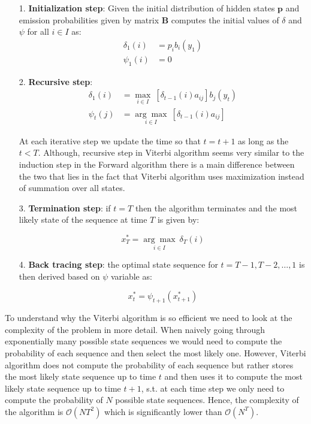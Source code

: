 \begin{itemize}
\item[1.] \textbf{Initialization step}: Given the initial distribution of hidden states $\textbf{p}$ and emission probabilities given by matrix $\textbf{B}$ computes the initial values 
of $\delta$ and $\psi$ for all $i \in I$ as:
\begin{align}
\delta_1(i) &= p_i b_i(y_1)  \\
\psi_1(i)& = 0
\end{align}

\item[2.] \textbf{Recursive step}:
\begin{align}
\delta_1(i) &= \underset{i \in I}{\max} \: \left[\delta_{t-1}(i)a_{ij}\right] b_j(y_t)  \\
\psi_t(j)& = \underset{i \in I}{\arg\max} \: \left[\delta_{t-1}(i)a_{ij}\right]
\end{align}

At each iterative step we update the time so that $t=t+1$ as long as the $t<T$. Although, recursive step in Viterbi algorithm seems very similar to the 
induction step in the Forward algorithm there is a main difference between the two that lies in the fact that Viterbi algorithm uses maximization instead of summation 
over all states. 

\item[3.] \textbf{Termination step}: if $t=T$ then the algorithm terminates and the most likely state of the sequence at time $T$ is given by:

\begin{equation}
x_T^* = \underset{i \in I}{\arg\max} \: \delta_{T}(i)
\end{equation}

\item[4.] \textbf{Back tracing step}: the optimal state sequence for $t = T-1,T-2,\ldots,1$ is then derived based on $\psi$ variable as:

\begin{equation}
x_t^* = \psi_{t+1}(x_{t+1}^*)
\end{equation}

\end{itemize}

To understand why the Viterbi algorithm is so efficient we need to look at the complexity of the problem in more detail. When naively going through exponentially many possible state sequences we would need to compute the probability of each sequence and then select the most likely one. However, Viterbi algorithm does not compute the probability of each sequence but rather stores the most likely state sequence up to time $t$ and then uses it to compute the most likely state sequence up to time $t+1$, s.t. at each time step we only need to compute the probability of $N$ possible state sequences. Hence, the complexity of the algorithm is $\mathcal{O}(NT^2)$ which is significantly lower than $\mathcal{O}(N^T)$. \citep{Bishop2006}


